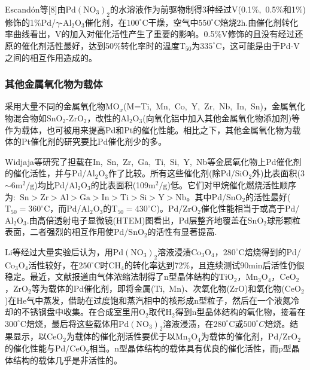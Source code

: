 \textrm{Escand\'on}等[8]由$\mathrm{Pd}(\mathrm{NO}_3)_2$的水溶液作为前驱物制得3种经过$\mathrm{V}$(0.1\%,~0.5\%和1\%)修饰的1\%\textrm{Pd}/$\gamma$-$\mathrm{Al}_2\mathrm{O}_3$催化剂，在$100^{\circ}\mathrm{C}$干燥，空气中$550^{\circ}\mathrm{C}$焙烧2\textrm{h}.由催化剂转化率曲线看出，\textrm{V}的加入对催化活性产生了重要的影响。0.5\%\textrm{V}修饰的且没有经过还原的催化剂活性最好，达到50\%转化率时的温度$\mathrm{T}_{50}$为$335^{\circ}\mathrm{C}$，这可能是由于\textrm{Pd}-\textrm{V}之间的相互作用造成的。

\subsubsection{其他金属氧化物为载体}
采用大量不同的金属氧化物$\mathrm{MO}_x$(\textrm{M=Ti,~Mn,~Co,~Y,~Zr,~Nb,~In,~Sn})，金属氧化物混合物如$\mathrm{SnO}_2$-$\mathrm{ZrO}_2$，改性的$\mathrm{Al}_2\mathrm{O}_3$(向氧化铝中加入其他金属氧化物添加剂)等作为载体，也可被用来提高\textrm{Pd}和\textrm{Pt}的催化性能。相比之下，其他金属氧化物为载体的\textrm{Pt}催化剂的研究要比\textrm{Pd}催化剂少的多。

\textrm{Widjaja}等\cite{CataD59-69_2000}研究了担载在\textrm{In,~Sn,~Zr,~Ga,~Ti,~Si,~Y,~Nb}等金属氧化物上\textrm{Pd}催化剂的催化活性，并与\textrm{Pd}/$\mathrm{Al}_2\mathrm{O}_3$作了比较。所有这些催化剂(除\textrm{Pd}/$\mathrm{SiO}_2$外)比表面积(3$\sim$6$\mathrm{m}^2/\mathrm{g}$)均比\textrm{Pd}/$\mathrm{Al}_2\mathrm{O}_3$的比表面积(109$\mathrm{m}^2/\mathrm{g}$)低。它们对甲烷催化燃烧活性顺序为:~$\mathrm{Sn}>\mathrm{Zr}>\mathrm{Al}>\mathrm{Ga}>\mathrm{In}>\mathrm{Ti}>\mathrm{Si}>\mathrm{Y}>\mathrm{Nb}$。其中\textrm{Pd}/$\mathrm{SnO}_2$的活性最好($\mathrm{T}_{50}=360^{\circ}\mathrm{C}$，而\textrm{Pd}/$\mathrm{Al}_2\mathrm{O}_3$的$\mathrm{T}_{50}=430^{\circ}\mathrm{C}$)。\textrm{Pd}/$\mathrm{ZrO}_2$催化性能相当于或高于\textrm{Pd}/$\mathrm{Al}_2\mathrm{O}_3$.由高倍透射电子显微镜(\textrm{HTEM})图看出，\textrm{Pd}层整齐地覆盖在$\mathrm{SnO}_2$球形颗粒表面，二者强烈的相互作用使\textrm{Pd}/$\mathrm{SnO}_2$的活性有显著提高.

\textrm{Li}等\cite{RKCL66-367_1999}经过大量实验后认为，用$\mathrm{Pd}(\mathrm{NO}_3)_2$溶液浸渍$\mathrm{Co}_3\mathrm{O}_4$，$280^{\circ}\mathrm{C}$焙烧得到的\textrm{Pd}/$\mathrm{Co}_3\mathrm{O}_4$活性较好，在$250^{\circ}\mathrm{C}$时$\mathrm{CH}_4$的转化率达到72\%，且连续测试90\textrm{min}后活性仍很稳定。最近，文献\cite{RKCL70-97_2000}报道由气体浓缩法制得了\textrm{n}型晶体结构的$\mathrm{TiO}_2$，$\mathrm{Mn}_3\mathrm{O}_4$，$\mathrm{CeO}_2$，$\mathrm{ZrO}_2$等为载体的\textrm{Pd}催化剂，即将金属(\textrm{Ti,~Mn})、次氧化物(\textrm{ZrO})和氧化物($\mathrm{CeO}_2$)在\textrm{He}气中蒸发，借助在过度饱和蒸汽相中的核形成\textrm{n}型粒子，然后在一个液氮冷却的不锈钢盘中收集。在合成室里用$\mathrm{O}_2$取代$\mathrm{H}_2$得到\textrm{n}型晶体结构的氧化物，接着在$300^{\circ}\mathrm{C}$焙烧，最后将这些载体用$\mathrm{Pd}(\mathrm{NO}_3)_2$溶液浸渍，在$280^{\circ}\mathrm{C}$或$500^{\circ}{C}$焙烧。结果显示，以$\mathrm{CeO}_2$为载体的催化剂活性要优于以$\mathrm{Mn}_3\mathrm{O}_4$为载体的催化剂，\textrm{Pd}/$\mathrm{ZrO}_2$的催化性能与\textrm{Pd}/$\mathrm{CeO}_2$相当。\textrm{n}型晶体结构的载体具有优良的催化活性，而\textrm{p}型晶体结构的载体几乎是非活性的。

